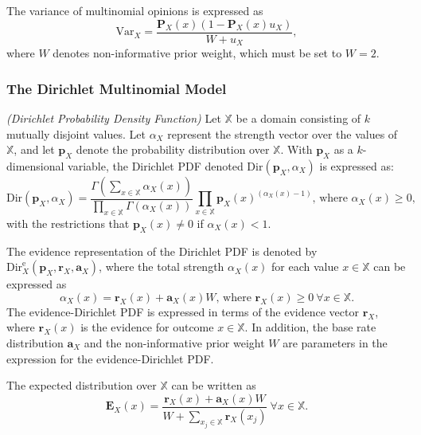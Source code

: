 The variance of multinomial opinions is expressed as
\begin{equation}
	\mathrm{Var}_X = \dfrac{\mathbf{P}_X(x)(1 - \mathbf{P}_X(x)u_X)}{W + u_X},
\end{equation}
where $W$ denotes non-informative prior weight, which must be set to $W = 2$.

\subsubsection{The Dirichlet Multinomial Model}

\begin{definition}
	\emph{(Dirichlet Probability Density Function)} Let $\mathbb{X}$ be a domain consisting of $k$ mutually disjoint values. Let $\alpha_X$ represent the strength vector over the
values of $\mathbb{X}$, and let $\mathbf{p}_X$ denote the probability distribution over $\mathbb{X}$. With $\mathbf{p}_X$ as a
$k$-dimensional variable, the Dirichlet PDF denoted $\mathrm{Dir}(\mathbf{p}_X, \alpha_{X})$ is expressed as:
	\begin{equation}
		\mathrm{Dir}(\mathbf{p}_X, \alpha_X) = \dfrac{\Gamma\left(\sum\limits_{x \in \mathbb{X}} \alpha_X(x)\right)}{\prod\limits_{x \in \mathbb{X}} \Gamma(\alpha_X(x))} \prod\limits_{x \in \mathbb{X}} \mathbf{p}_X(x)^{(\alpha_X(x)-1)} \text{, where } \alpha_X(x) \geq 0\text{,}
	\end{equation}
	with the restrictions that $\mathbf{p}_X(x) \neq 0$ if $\alpha_X(x)	< 1$.
\end{definition}

The evidence representation of the Dirichlet PDF is denoted by $\mathrm{Dir}^{\mathrm{e}}_X(\mathbf{p}_X, \mathbf{r}_X, \mathbf{a}_X)$, where the total strength $\alpha_X(x)$ for each value $x \in \mathbb{X}$ can be expressed as
\begin{equation}
    \alpha_X(x) = \mathbf{r}_X(x) + \mathbf{a}_X(x)W\text{, where }\mathbf{r}_X(x) \geq 0\ \forall x \in \mathbb{X}\text{.}
\end{equation}
The evidence-Dirichlet PDF is expressed in terms of the evidence vector $\mathbf{r}_X$, where $\mathbf{r}_X(x)$ is the evidence for outcome $x \in \mathbb{X}$. In addition, the base rate distribution $\mathbf{a}_X$ and the non-informative prior weight $W$ are parameters in the expression for
the evidence-Dirichlet PDF.

The expected distribution over $\mathbb{X}$ can be written as
\begin{equation}\label{eq:dirithlet_expected_probability}
    \mathbf{E}_X(x) = \dfrac{\mathbf{r}_X(x) + \mathbf{a}_X(x)W}{W + \sum\limits_{x_j \in \mathbb{X}} \mathbf{r}_X(x_j)}\ \forall x \in \mathbb{X}.
\end{equation}

